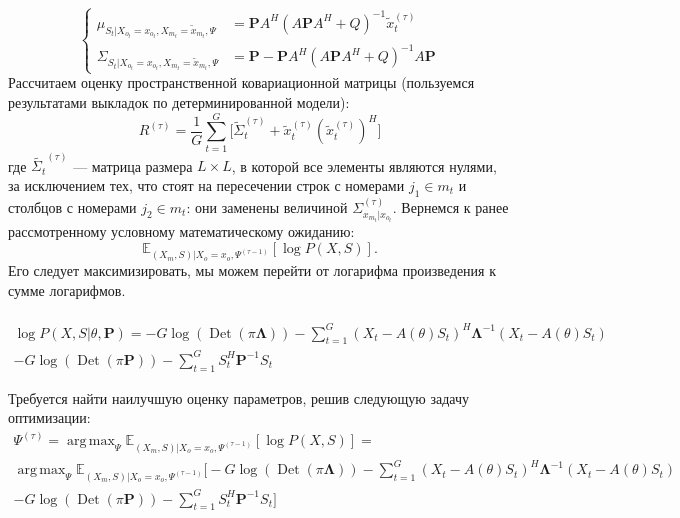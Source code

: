 \documentclass[11pt]{article}
\newcommand{\Expect}{\mathbb{E}}
\DeclareMathOperator*{\argmax}{arg \, \max}
\DeclareMathOperator{\Det}{Det}
\begin{document}
\begin{equation}
\left\{ \begin{aligned} 
\mu_{S_t|X_{o_t} = x_{o_t}, X_{m_t} = \widetilde{x}_{m_t}, \Psi} &= \mathbf{P}A^H(A\mathbf{P}A^H+Q)^{-1}\widetilde{x}_t^{(\tau)} \\
\Sigma_{S_t|X_{o_t} = x_{o_t}, X_{m_t} = \widetilde{x}_{m_t}, \Psi} &= \mathbf{P} - \mathbf{P}A^H(A\mathbf{P}A^H+Q)^{-1}A\mathbf{P}
\end{aligned} \right.
\end{equation}
Рассчитаем оценку пространственной ковариационной матрицы (пользуемся результатами выкладок по детерминированной модели):
\begin{equation}
{R}^{(\tau)} = \frac{1}{G} \sum_{t = 1}^{G} \Big[ \widetilde{\Sigma}_{t}^{(\tau)} + \widetilde{x}_t^{(\tau)}(\widetilde{x}_t^{(\tau)})^H \Big]
\end{equation}
где $\widetilde{\Sigma_{t}}^{(\tau)}$ --- матрица размера $L \times L$, в которой все элементы являются нулями, за исключением тех, что стоят на пересечении строк с номерами $j_1 \in m_t$ и столбцов с номерами $j_2 \in m_t$: они заменены величиной $\Sigma^{(\tau)}_{x_{m_t}|x_{o_t}}$.
Вернемся к ранее рассмотренному условному математическому ожиданию:
\begin{equation*}
 \Expect_{(X_m,S)|X_o=x_o, \Psi^{(\tau-1)}}[\log P(X, S)].
\end{equation*}
Его следует максимизировать, мы можем перейти от логарифма произведения к сумме логарифмов. 
\\
\\
\begin{equation*}
\begin{gathered}
\log P(X,S|\theta, \mathbf{P}) = -G \log (\Det(\pi \mathbf{\Lambda})) - \sum_{t=1}^G (X_t-A(\theta)S_t)^H \mathbf{\Lambda}^{-1}(X_t-A(\theta)S_t) 
\\ - G \log(\Det(\pi \mathbf{P})) - \sum_{t=1}^G S_t^H \mathbf{P}^{-1}S_t
\end{gathered}
\end{equation*}
\begin{center}
\fontsize{14}{18}\selectfont {}
\end{center}
Требуется найти наилучшую оценку параметров, решив следующую задачу оптимизации:
\begin{equation*}
\begin{gathered}
\Psi^{(\tau)}=\argmax_{\Psi} \Expect_{(X_m,S)|X_o=x_o, \Psi^{(\tau-1)}}[\log P(X, S)] = \\
\argmax_{\Psi} \Expect_{(X_m,S)|X_o=x_o, \Psi^{(\tau-1)}}\bigg[-G \log (\Det(\pi \mathbf{\Lambda})) - \sum_{t=1}^G (X_t-A(\theta)S_t)^H \mathbf{\Lambda}^{-1}(X_t-A(\theta)S_t) 
\\ - G \log(\Det(\pi \mathbf{P})) - \sum_{t=1}^G S_t^H \mathbf{P}^{-1}S_t\bigg]
\end{gathered}
\end{equation*}
\end{document}
